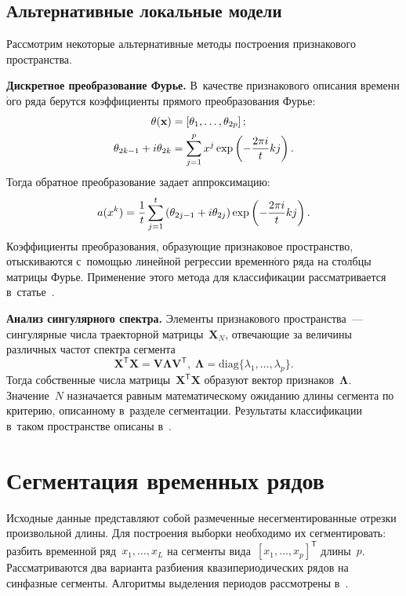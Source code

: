 \begin{multicols}{2}
\subsection{Альтернативные локальные модели}
Рассмотрим некоторые альтернативные методы построения признакового пространства.

\textbf{Дискретное преобразование Фурье.} 
В~качестве признакового описания временн$\acute{\mbox{о}}$го ряда берутся коэффициенты 
прямого преобразования Фурье:
\begin{align*}
 \theta(\mathbf{x})&=
 \left[\theta_1,\dots,\theta_{2p}\right];\\
 \theta_{2k-1}+i\theta_{2k}&=\sum\limits_{j=1}^p x^j 
 \exp\left(-\displaystyle\frac{\displaystyle 2\pi i\mathstrut}{\displaystyle t\mathstrut}kj\right).
\end{align*}
Тогда обратное преобразование задает аппроксимацию: 
$$
a(x^k)=\displaystyle\frac{\displaystyle 1\mathstrut}{\displaystyle t\mathstrut}\sum\limits_{j=1}^t\left(\theta_{2j-1}+i\theta_{2j}\right)
\exp\left( -\displaystyle\frac{\displaystyle 2\pi i\mathstrut}{\displaystyle t\mathstrut}kj\right).
$$
Коэффициенты преобразования, образующие признаковое про\-стран\-ст\-во, 
отыскиваются с~по\-мощью линейной регрессии временн$\acute{\mbox{о}}$го 
ряда на столбцы мат\-ри\-цы Фурье. Применение этого метода для классификации 
рас\-смат\-ри\-ва\-ет\-ся в~статье~\cite{Karasikov2016}.

\textbf{Анализ сингулярного спектра.} 
Элементы признакового пространства~--- сингулярные числа 
траекторной мат\-ри\-цы~$\mathbf{X}_N$, отвечающие за величины различных час\-тот 
спект\-ра сегмента
\begin{equation}
\label{8-str}
\textbf{X}^\mathsf{T}\textbf{X}=\textbf{V}\boldsymbol{\Lambda} 
\textbf{V}^\mathsf{T},\; \boldsymbol{\Lambda}=\mathrm{diag}\{\lambda_1,\ldots,\lambda_p\}.
\end{equation}
Тогда собственные числа матрицы~$\mathbf{X}^\mathsf{T}\textbf{X}$ 
образуют вектор признаков~$\boldsymbol{\Lambda}.$
Значение~$N$ назначается равным математическому ожиданию длины сегмента 
по критерию, описанному в~разделе сегментации. 
Результаты классификации в~таком пространстве описаны в~\cite{ivkin2015}.

\section{Сегментация временных рядов}

Исходные данные представляют собой размеченные несегментированные
 отрезки произвольной длины. Для построения выборки необходимо 
 их сегментировать: разбить временной ряд~$x_1,\ldots,x_L$ на сегменты 
 вида~$[x_1,\ldots,x_p]^\mathsf{T}$ длины~$p$.
Рассматриваются два варианта разбиения квазипериодических рядов 
на синфазные сегменты. Алгоритмы выделения периодов рассмотрены 
в~\cite{vasko2002estimating,Motrenko2015Fundamental}.


\end{multicols}
